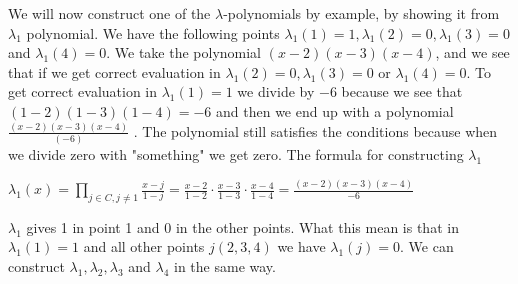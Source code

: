 \noindent
We will now construct one of the \begin{math}\lambda\end{math}-polynomials by example, by showing it from \begin{math}\lambda_1\end{math} polynomial. 
We have the following points \begin{math}\lambda_1(1)=1, \lambda_1(2)=0, \lambda_1(3)=0 \end{math} and \begin{math} \lambda_1 (4)=0\end{math}. We take the polynomial \begin{math} (x-2)(x-3)(x-4)\end{math}, and we see that if we get correct evaluation in \begin{math}\lambda_1 (2)=0, \lambda_1 (3)=0\end{math} or \begin{math} \lambda_1 (4)=0\end{math}. To get correct evaluation in  \begin{math} \lambda_1 (1)=1\end{math} we divide by \begin{math}-6\end{math} because we see that \begin{math}(1-2)(1-3)(1-4)=-6\end{math} and then we end up with a polynomial \begin{math}\frac{(x-2)(x-3)(x-4)}{(-6)}\end{math} .  The polynomial still satisfies the conditions because when we divide zero with "something" we get zero.  The formula for constructing \begin{math}\lambda_1\end{math} 

\begin{center}
\begin{math} \lambda_1(x)=\prod\limits_{j\in C,j\neq1} \frac{x-j}{1-j} = \frac{x-2}{1-2} \cdot \frac{x-3}{1-3} \cdot \frac{x-4}{1-4}=\frac{(x-2)(x-3)(x-4)}{-6} \end{math}\\
\end{center}

\noindent
\begin{math} \lambda_1\end{math} gives 1 in point 1 and 0 in the other points. What this mean is that in \begin{math} \lambda_1(1)=1\end{math} and all other points  \begin{math}j (2,3,4)\end{math} we have \begin{math} \lambda_1 (j)=0\end{math}. We can construct \begin{math}\lambda_1, \lambda_2, \lambda_3\end{math} and  \begin{math}\lambda_4\end{math} in the same way.

